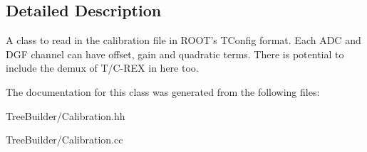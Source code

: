 \subsection{Detailed Description}
A class to read in the calibration file in R\-O\-O\-T's T\-Config format. Each A\-D\-C and D\-G\-F channel can have offset, gain and quadratic terms. There is potential to include the demux of T/\-C-\/\-R\-E\-X in here too. 

The documentation for this class was generated from the following files\-:\begin{DoxyCompactItemize}
\item 
Tree\-Builder/Calibration.\-hh\item 
Tree\-Builder/Calibration.\-cc\end{DoxyCompactItemize}
